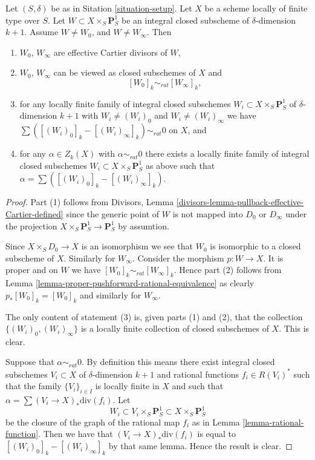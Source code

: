 \begin{lemma}
\label{lemma-rational-equivalence-family}
Let $(S, \delta)$ be as in Sitation \ref{situation-setup}.
Let $X$ be a scheme locally of finite type over $S$.
Let $W \subset X \times_S \mathbf{P}^1_S$ be an integral
closed subscheme of $\delta$-dimension $k + 1$.
Assume $W \not = W_0$, and $W \not = W_\infty$. Then
\begin{enumerate}
\item $W_0$, $W_\infty$ are effective Cartier divisors of $W$,
\item $W_0$, $W_\infty$ can be viewed as closed subschemes
of $X$ and
$$
[W_0]_k \sim_{rat} [W_\infty]_k,
$$
\item for any locally finite family of
integral closed subschemes
$W_i \subset X \times_S \mathbf{P}^1_S$
of $\delta$-dimension $k + 1$ with $W_i \not = (W_i)_0$ and
$W_i \not = (W_i)_\infty$ we have
$\sum ([(W_i)_0]_k - [(W_i)_\infty]_k) \sim_{rat} 0$
on $X$, and
\item for any $\alpha \in Z_k(X)$ with $\alpha \sim_{rat} 0$
there exists a locally finite family of
integral closed subschemes $W_i \subset X \times_S \mathbf{P}^1_S$
as above such that $\alpha = \sum ([(W_i)_0]_k - [(W_i)_\infty]_k)$.
\end{enumerate}
\end{lemma}

\begin{proof}
Part (1) follows from
Divisors, Lemma \ref{divisors-lemma-pullback-effective-Cartier-defined}
since the generic point
of $W$ is not mapped into $D_0$ or $D_\infty$ under the projection
$X \times_S \mathbf{P}^1_S \to \mathbf{P}^1_S$ by assumtion.

\medskip\noindent
Since $X \times_S D_0 \to X$ is an isomorphism we see that $W_0$
is isomorphic to a closed subscheme of $X$. Similarly for $W_\infty$.
Consider the morphism $p : W \to X$. It is proper and on $W$ we have
$[W_0]_k \sim_{rat} [W_\infty]_k$. Hence part (2) follows from
Lemma \ref{lemma-proper-pushforward-rational-equivalence} as clearly
$p_*[W_0]_k = [W_0]_k$ and similarly for $W_\infty$.

\medskip\noindent
The only content of statement (3) is, given parts (1) and (2), that
the collection $\{(W_i)_0, (W_i)_\infty\}$ is a locally finite collection
of closed subschemes of $X$. This is clear.

\medskip\noindent
Suppose that $\alpha \sim_{rat} 0$.
By definition this means there exist integral closed subschemes
$V_i \subset X$ of $\delta$-dimension $k + 1$ and rational
functions $f_i \in R(V_i)^*$ such that the family
$\{V_i\}_{i \in I}$ is locally finite in $X$ and such that
$\alpha = \sum (V_i \to X)_*\text{div}(f_i)$.
Let
$$
W_i \subset V_i \times_S \mathbf{P}^1_S \subset X \times_S \mathbf{P}^1_S
$$
be the closure of the graph of the rational map $f_i$ as in
Lemma \ref{lemma-rational-function}.
Then we have that $(V_i \to X)_*\text{div}(f_i)$
is equal to $[(W_i)_0]_k - [(W_i)_\infty]_k$ by that same lemma.
Hence the result is clear.
\end{proof}

